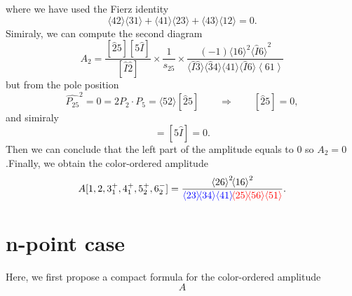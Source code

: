 \documentclass[12pt]{article}
\newcommand{\mdavg}[2]{\langle #1 \rangle\!\langle #2 \rangle}
\newcommand{\avg}[1]{\left\langle #1 \right\rangle}
\newcommand{\inavg}[2]{\langle #1 \rangle\! [#2]}
\newcommand{\asqu}[1]{{\langle#1\rangle}^2}
\begin{document}
where we have used the Fierz identity
\begin{equation*}
    \mdavg{42}{31}+\mdavg{41}{23}+\mdavg{43}{12}=0.
\end{equation*}
Simiraly, we can compute the second diagram
\begin{equation*}
    A_2=\frac{[\hat{2}5][5\hat{I}]}{[\hat{I}\hat{2}]}\times\frac{1}{s_{25}}\times \frac{(-1)\asqu{16}\asqu{\hat{I}6}}{\mdavg{\hat{I}\hat{3}}{\hat{3}4}
    \!\mdavg{41}{\hat{I}6}\!\avg{61}}
\end{equation*}
but from the pole position
\begin{equation*}
    \hat{P_{25}}^2=0=2P_2\cdot P_5=\inavg{52}{\hat{2}5}\qquad\Rightarrow \qquad [\hat{2}5]=0,
\end{equation*}
and simiraly
\begin{equation*}
    [\hat{2}\hat{I}]=[5\hat{I}]=0.
\end{equation*}
Then we can conclude that the left part of the amplitude equals to 0 so $A_2=0$.Finally, we obtain the color-ordered amplitude 
\begin{equation*}
    A[1,2,3_1^+,4_1^+,5_2^+,6_2^-]=\frac{\asqu{26}\!\asqu{16}}{\textcolor{blue}{\mdavg{23}{34}\!\avg{41}}\!\textcolor{red}{\mdavg{25}{56}\!\avg{51}}}.
\end{equation*}
\section{n-point case}
Here, we first propose a compact formula for the color-ordered amplitude
\begin{equation*}
    A
\end{equation*}
\end{document}
